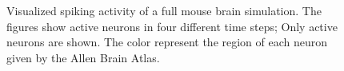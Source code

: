 \begin{figure}[ht!]
\begin{center}
{		}
    \end{center}
    \caption[Visualized spiking activity of a full mouse brain simulation]{%
        Visualized spiking activity of a full mouse brain simulation.
        The figures show active neurons in four different time steps;
        Only active neurons are shown.
        The color represent the region of each neuron given by the Allen Brain Atlas\cite{jones2009allen}.
     }%
   \label{fig:sim}
\end{figure}

